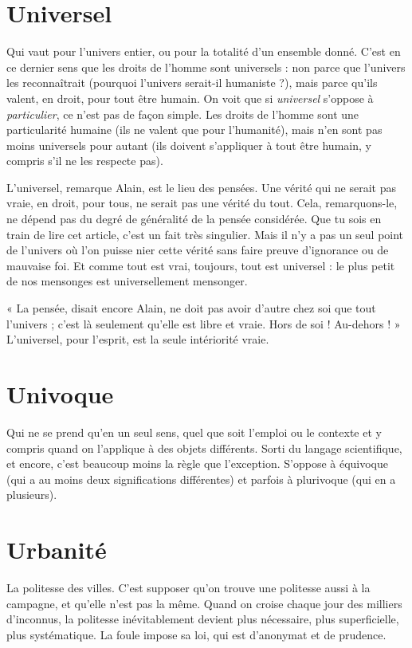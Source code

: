 \section{Universel}
Qui vaut pour l’univers entier, ou pour la totalité d’un
ensemble donné. C’est en ce dernier sens que les droits de
l’homme sont universels : non parce que l’univers les reconnaîtrait (pourquoi
l'univers serait-il humaniste ?), mais parce qu’ils valent, en droit, pour tout être
humain. On voit que si {\it universel} s'oppose à {\it particulier}, ce n’est pas de façon
simple. Les droits de l’homme sont une particularité humaine (ils ne valent que
pour l'humanité), mais n’en sont pas moins universels pour autant (ils doivent
s'appliquer à tout être humain, y compris s’il ne les respecte pas).

L’universel, remarque Alain, est le lieu des pensées. Une vérité qui ne
serait pas vraie, en droit, pour tous, ne serait pas une vérité du tout. Cela,
remarquons-le, ne dépend pas du degré de généralité de la pensée considérée.
Que tu sois en train de lire cet article, c’est un fait très singulier. Mais
il n’y a pas un seul point de l’univers où l’on puisse nier cette vérité sans
faire preuve d’ignorance ou de mauvaise foi. Et comme tout est vrai, toujours,
tout est universel : le plus petit de nos mensonges est universellement
mensonger.

« La pensée, disait encore Alain, ne doit pas avoir d’autre chez soi que tout
l'univers ; c’est là seulement qu’elle est libre et vraie. Hors de soi ! Au-dehors ! »
L’universel, pour l’esprit, est la seule intériorité vraie.

\section{Univoque}
Qui ne se prend qu’en un seul sens, quel que soit l'emploi ou
le contexte et y compris quand on l’applique à des objets différents.
Sorti du langage scientifique, et encore, c’est beaucoup moins la règle
que l’exception. S’oppose à équivoque (qui a au moins deux significations différentes)
et parfois à plurivoque (qui en a plusieurs).

\section{Urbanité}
La politesse des villes. C’est supposer qu’on trouve une politesse
aussi à la campagne, et qu’elle n’est pas la même. Quand
on croise chaque jour des milliers d’inconnus, la politesse inévitablement
devient plus nécessaire, plus superficielle, plus systématique. La foule impose sa
loi, qui est d’anonymat et de prudence.


